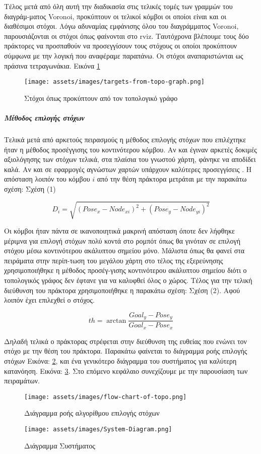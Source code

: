 Τέλος μετά από όλη αυτή την διαδικασία στις τελικές τομές των γραμμών του διαγράμ-ματος Voronoi, προκύπτουν οι τελικοί κόμβοι οι οποίοι είναι και οι διαθέσιμοι στόχοι. Λόγω αδυναμίας εμφάνισης όλου του διαγράμματος Voronoi,
παρουσιάζονται οι στόχοι όπως φαίνονται στο rviz. Ταυτόχρονα βλέπουμε τους δύο πράκτορες να προσπαθούν να προσεγγίσουν τους στόχους οι οποίοι προκύπτουν σύμφωνα με την λογική που αναφέραμε παραπάνω. Οι στόχοι αναπαριστώνται ως πράσινα τετραγωνάκια. Εικόνα \ref{fig:topo graph goals}

\begin{figure}[!h]
	\centering
	\texttt{[image: assets/images/targets-from-topo-graph.png]}
	\caption{Στόχοι όπως προκύπτουν από τον τοπολογικό γράφο}
	\label{fig:topo graph goals}
\end{figure}


\subparagraph{Μέθοδος επιλογής στόχων} Τελικά μετά από αρκετούς πειρασμούς η μέθοδος επιλογής στόχων που επιλέχτηκε ήταν η μέθοδος προσέγγισης του κοντινότερου κόμβου. Αν και έγιναν αρκετές δοκιμές αξιολόγησης των στόχων τελικά, στα πλαίσια του γνωστού χάρτη, φάνηκε να αποδίδει καλά. Αν και σε εφαρμογές αγνώστων χαρτών υπάρχουν καλύτερες προσεγγίσεις \cite{Tsardoulias2013}. Η απόσταση λοιπόν του κόμβου $ i $ από την θέση πράκτορα μετράται με την παρακάτω σχέση: Σχέση (1)

\begin{equation}
D_{i} = \sqrt{ (Pose_x - Node_{xi})^2 + (Pose_y - Node_{yi})^2   }
\end{equation}
 
Οι κόμβοι ήταν πάντα σε ικανοποιητικά μακρινή απόσταση όποτε δεν λήφθηκε μέριμνα για επιλογή στόχων πολύ κοντά στο ρομπότ όπως θα γινόταν σε επιλογή στόχου μέσω κοντινότερου ακάλυπτου σημείου μόνο. 
Μάλιστα όπως θα φανεί στα πειράματα στην περίπ-τωση του μεγάλου χάρτη στο τέλος της εξερεύνησης χρησιμοποιήθηκε η μέθοδος προσέγ-γισης κοντινότερου ακάλυπτου σημείου διότι ο τοπολογικός γράφος δεν έφτανε για να καλυφθεί όλος ο χώρος. 
Τέλος για την τελική διεύθυνση του πράκτορα χρησιμοποιήθηκε η παρακάτω σχέση: Σχέση (2).
Αφού λοιπόν έχει επιλεχθεί ο στόχος.

\begin{equation}
th = \arctan{\frac{Goal_y - Pose_y}{Goal_x - Pose_x}} 
\end{equation}

Δηλαδή τελικά ο πράκτορας στρέφεται στην διεύθυνση της ευθείας που ενώνει τον στόχο με την θέση του πράκτορα. Παρακάτω φαίνεται το διάγραμμα ροής επιλογής στόχων Εικόνα: \ref{fig:flow-chart}, και ένα γενικότερο διάγραμμα του συστήματος για καλύτερη κατανόηση. Εικόνα: \ref{fig:system-chart}. Στο επόμενο κεφάλαιο συνεχίζουμε με την παρουσίαση των πειραμάτων.

 
 \begin{figure}[!h]
 	\centering
 	\texttt{[image: assets/images/flow-chart-of-topo.png]}
 	\caption{Διάγραμμα ροής αλγορίθμου επιλογής στόχων}
 	\label{fig:flow-chart}
 \end{figure}
 
 \begin{figure}[!ht]
 	\centering
 	\texttt{[image: assets/images/System-Diagram.png]}
 	\caption{Διάγραμμα Συστήματος}
 	\label{fig:system-chart}
 \end{figure}